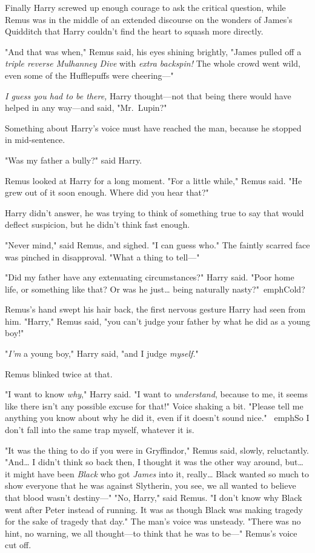 Finally Harry screwed up enough courage to ask the critical question, while 
Remus was in the middle of an extended discourse on the wonders of James's 
Quidditch that Harry couldn't find the heart to squash more directly.

"And that was when," Remus said, his eyes shining brightly, "James pulled off a 
\emph{triple reverse Mulhanney Dive} with \emph{extra backspin!} The whole 
crowd went wild, even some of the Hufflepuffs were cheering---"

\emph{I guess you had to be there,} Harry thought---not that being there would 
have helped in any way---and said, "Mr.~Lupin?"

Something about Harry's voice must have reached the man, because he stopped in 
mid-sentence.

"Was my father a bully?" said Harry.

Remus looked at Harry for a long moment. "For a little while," Remus said. "He 
grew out of it soon enough. Where did you hear that?"

Harry didn't answer, he was trying to think of something true to say that would 
deflect suspicion, but he didn't think fast enough.

"Never mind," said Remus, and sighed. "I can guess who." The faintly scarred 
face was pinched in disapproval. "What a thing to tell---"

"Did my father have any extenuating circumstances?" Harry said. "Poor home 
life, or something like that? Or was he just{\ldots} being naturally 
nasty?"\ emph{Cold?}

Remus's hand swept his hair back, the first nervous gesture Harry had seen from 
him. "Harry," Remus said, "you can't judge your father by what he did as a 
young boy!"

"\emph{I'm} a young boy," Harry said, "and I judge \emph{myself.}"

Remus blinked twice at that.

"I want to know \emph{why}," Harry said. "I want to \emph{understand}, because 
to me, it seems like there isn't any possible excuse for that!" Voice shaking a 
bit. "Please tell me anything you know about why he did it, even if it doesn't 
sound nice." \ emph{So I don't fall into the same trap myself, whatever it is.}

"It was the thing to do if you were in Gryffindor," Remus said, slowly, 
reluctantly. "And{\ldots} I didn't think so back then, I thought it was the 
other way around, but{\ldots} it might have been \emph{Black} who got 
\emph{James} into it, really{\ldots} Black wanted so much to show everyone that 
he was against Slytherin, you see, we all wanted to believe that blood wasn't 
destiny---"
\sbreak
"No, Harry," said Remus. "I don't know why Black went after Peter instead of 
running. It was as though Black was making tragedy for the sake of tragedy that 
day." The man's voice was unsteady. "There was no hint, no warning, we all 
thought---to think that he was to be---" Remus's voice cut off.

